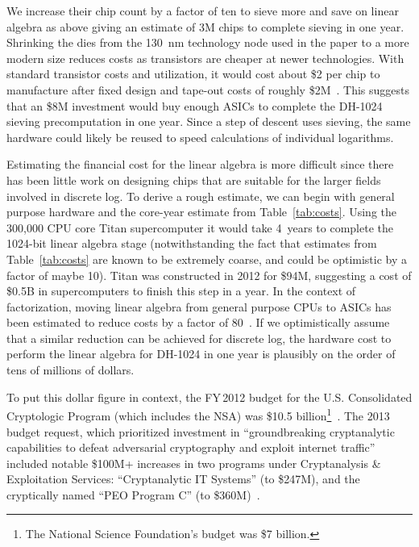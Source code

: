 We increase their chip count by a factor of ten to sieve more and save on
linear algebra as above giving an estimate of 3M chips to complete sieving in
one year. Shrinking the dies from the 130~nm technology node used in the
paper to a more modern size reduces costs as transistors are cheaper at newer
technologies. With standard transistor costs and utilization, it would cost
about \$2 per chip to manufacture after fixed design and tape-out costs of
roughly \$2M~\cite{jefferies-report-2012}. This suggests that an \$8M
investment would buy enough ASICs to complete the DH-1024 sieving
precomputation in one year. Since a step of descent uses sieving, the same
hardware could likely be reused to speed calculations of individual
logarithms.

Estimating the financial cost for the linear algebra is more difficult since
there has been little work on designing chips that are suitable for the
larger fields involved in discrete log. To derive a rough estimate, we can
begin with general purpose hardware and the core-year estimate from
Table~\ref{tab:costs}. Using the 300,000 CPU core Titan supercomputer it
would take 4~years to complete the 1024-bit linear algebra stage
(notwithstanding the fact that estimates from Table~\ref{tab:costs} are known
to be extremely coarse, and could be optimistic by a factor of maybe 10).
Titan was constructed in 2012 for \$94M, suggesting a cost of \$0.5B in
supercomputers to finish this step in a year. In the context of
factorization, moving linear algebra from general purpose CPUs to ASICs has
been estimated to reduce costs by a factor of
80~\cite{improving-linear-algebra-nfs-2005}. If we optimistically assume that
a similar reduction can be achieved for discrete log, the hardware cost to
perform the linear algebra for DH-1024 in one year is plausibly on the order
of tens of millions of dollars.

To put this dollar figure in context, the FY\,2012 budget for the U.S.
Consolidated Cryptologic Program (which includes the NSA) was \$10.5
billion\footnote{\small The National Science Foundation's budget was \$7
billion.}~\cite{black-budget-leak-2013}. The 2013 budget request, which
prioritized investment in ``groundbreaking cryptanalytic capabilities to
defeat adversarial cryptography and exploit internet traffic'' included
notable \$100M+ increases in two programs under Cryptanalysis \& Exploitation
Services: ``Cryptanalytic IT Systems'' (to \$247M), and the cryptically named
``PEO Program C'' (to \$360M)~\cite{black-budget-leak-2013}.

